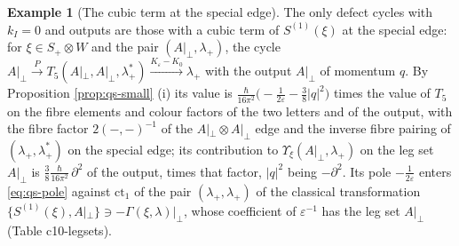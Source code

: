 \documentclass[11pt]{article}
\numberwithin{equation}{section}
\theoremstyle{plain}
\theoremstyle{definition}
\newtheorem{example}[theorem]{Example}
\newcommand{\Ap}{A|_{\perp}}
\begin{document}
\begin{example}[The cubic term at the special edge]
\label{ex:qs-cubic}
The only defect cycles with $k_I=0$ and outputs are those with a cubic term of $S^{(1)}(\xi)$ at the special edge: for $\xi\in S_+\otimes W$ and the pair $(\Ap,\lambda_+)$, the cycle $\Ap\xrightarrow{P}T_5(\Ap,\Ap,\lambda^*_+)\xrightarrow{K_\varepsilon-K_0}\lambda_+$ with the output $\Ap$ of momentum $q$. By Proposition \ref{prop:qs-small} (i) its value is $\frac{\hbar}{16\pi^2}\big(-\frac1{2\varepsilon}-\frac38|q|^2\big)$ times the value of $T_5$ on the fibre elements and colour factors of the two letters and of the output, with the fibre factor $2(-,-)^{-1}$ of the $\Ap\otimes\Ap$ edge and the inverse fibre pairing of $(\lambda_+,\lambda^*_+)$ on the special edge; its contribution to $\Upsilon_\xi(\Ap,\lambda_+)$ on the leg set $\Ap$ is $\frac38\frac{\hbar}{16\pi^2}\,\partial^2$ of the output, times that factor, $|q|^2$ being $-\partial^2$. Its pole $-\frac1{2\varepsilon}$ enters \eqref{eq:qs-pole} against $\mathrm{ct}_1$ of the pair $(\lambda_+,\lambda_+)$ of the classical transformation $\{S^{(1)}(\xi),\Ap\}\ni-\Gamma(\xi,\lambda)|_\perp$, whose coefficient of $\varepsilon^{-1}$ has the leg set $\Ap$ (Table c10-legsets).
\end{example}
\end{document}
